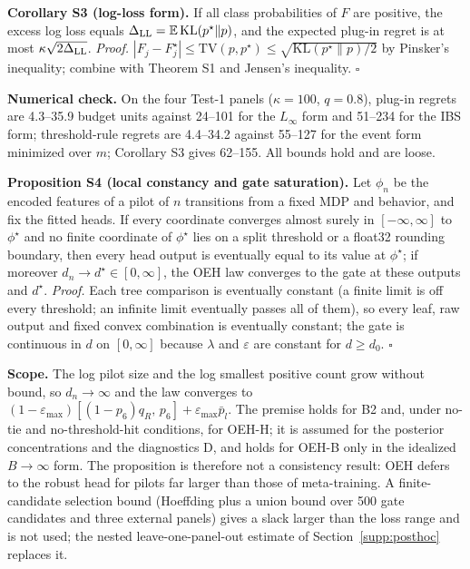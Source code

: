 \textbf{Corollary S3 (log-loss form).} If all class probabilities of $F$ are positive, the excess log loss equals $\Delta_{\rm LL}=\mathbb E\,\mathrm{KL}(p^\star\|p)$, and the expected plug-in regret is at most $\kappa\sqrt{2\Delta_{\rm LL}}$. \emph{Proof.} $|F_j-F^\star_j|\le\mathrm{TV}(p,p^\star)\le\sqrt{\mathrm{KL}(p^\star\|p)/2}$ by Pinsker's inequality; combine with Theorem S1 and Jensen's inequality. $\square$

\textbf{Numerical check.} On the four Test-1 panels ($\kappa=100$, $q=0.8$), plug-in regrets are 4.3--35.9 budget units against 24--101 for the $L_\infty$ form and 51--234 for the IBS form; threshold-rule regrets are 4.4--34.2 against 55--127 for the event form minimized over $m$; Corollary S3 gives 62--155. All bounds hold and are loose.

\textbf{Proposition S4 (local constancy and gate saturation).} Let $\phi_n$ be the encoded features of a pilot of $n$ transitions from a fixed MDP and behavior, and fix the fitted heads. If every coordinate converges almost surely in $[-\infty,\infty]$ to $\phi^\star$ and no finite coordinate of $\phi^\star$ lies on a split threshold or a float32 rounding boundary, then every head output is eventually equal to its value at $\phi^\star$; if moreover $d_n\to d^\star\in[0,\infty]$, the OEH law converges to the gate at these outputs and $d^\star$. \emph{Proof.} Each tree comparison is eventually constant (a finite limit is off every threshold; an infinite limit eventually passes all of them), so every leaf, raw output and fixed convex combination is eventually constant; the gate is continuous in $d$ on $[0,\infty]$ because $\lambda$ and $\varepsilon$ are constant for $d\ge d_0$. $\square$

\textbf{Scope.} The log pilot size and the log smallest positive count grow without bound, so $d_n\to\infty$ and the law converges to $(1-\varepsilon_{\max})[(1-p_6)q_R,\,p_6]+\varepsilon_{\max}\bar p_l$. The premise holds for B2 and, under no-tie and no-threshold-hit conditions, for OEH-H; it is assumed for the posterior concentrations and the diagnostics D, and holds for OEH-B only in the idealized $B\to\infty$ form. The proposition is therefore not a consistency result: OEH defers to the robust head for pilots far larger than those of meta-training. A finite-candidate selection bound (Hoeffding plus a union bound over 500 gate candidates and three external panels) gives a slack larger than the loss range and is not used; the nested leave-one-panel-out estimate of Section~\ref{supp:posthoc} replaces it.
